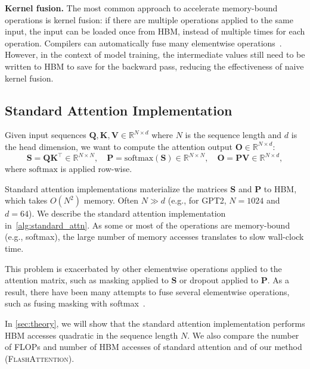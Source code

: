 \documentclass{article}
\newcommand{\softmax}{\mathrm{softmax}}
\newcommand{\vQ}{\mathbf{Q}}
\newcommand{\vK}{\mathbf{K}}
\newcommand{\vV}{\mathbf{V}}
\newcommand{\vS}{\mathbf{S}}
\newcommand{\vP}{\mathbf{P}}
\newcommand{\vO}{\mathbf{O}}
\newcommand{\sysname}{\textsc{FlashAttention}\xspace}
\begin{document}
\textbf{Kernel fusion.}
The most common approach to accelerate memory-bound operations is
kernel fusion: if there are multiple operations applied to the same input,
the input can be loaded once from HBM, instead of multiple times for each operation.
Compilers can automatically fuse many elementwise operations~\citep{li2020deep, paszke2019pytorch, sabne2020xla}.
However, in the context of model training, the intermediate values still need
to be written to HBM to save for the backward pass, reducing the
effectiveness of naive kernel fusion.

\subsection{Standard Attention Implementation}
\label{subsec:standard_attn}

Given input sequences $\vQ, \vK, \vV \in \mathbb{R}^{N \times d}$ where $N$ is the sequence length and
$d$ is the head dimension, we want to compute the attention output $\vO \in \mathbb{R}^{N \times d}$:
\begin{equation*}
  \vS = \vQ \vK^\top \in \mathbb{R}^{N \times N}, \quad \vP = \softmax(\vS) \in \mathbb{R}^{N \times N}, \quad \vO = \vP\vV \in \mathbb{R}^{N \times d},
\end{equation*}
where $\softmax$ is applied row-wise.

Standard attention implementations materialize the matrices $\vS$ and $\vP$ to HBM, which takes $O(N^2)$ memory.
Often $N \gg d$ (e.g., for GPT2, $N = 1024$ and $d = 64$).
We describe the standard attention implementation in~\cref{alg:standard_attn}.
As some or most of the operations are memory-bound (e.g., softmax), the large number of
memory accesses translates to slow wall-clock time.

This problem is exacerbated by other elementwise operations applied
to the attention matrix, such as masking applied to $\vS$ or dropout applied to $\vP$.
As a result, there have been many attempts to fuse several elementwise
operations, such as fusing masking with softmax~\citep{shoeybi2019megatron}.

In \cref{sec:theory}, we will show that the standard attention implementation
performs HBM accesses quadratic in the sequence length $N$.
We also compare the number of FLOPs and number of HBM accesses of standard
attention and of our method (\sysname).
\end{document}
